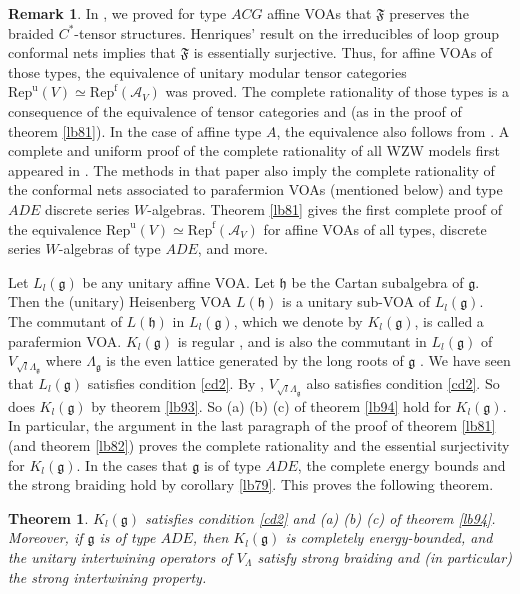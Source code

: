 \documentclass[12pt,a4paper]{article}
\theoremstyle{definition}
\newtheorem{rem}[df]{Remark}
\theoremstyle{plain}
\newtheorem{thm}[df]{Theorem}
\newcommand{\fk}{\mathfrak}
\newcommand{\mc}{\mathcal}
\newcommand{\gk}{\mathfrak g}
\newcommand{\hk}{\mathfrak h}
\newcommand{\Repf}{\mathrm{Rep}^{\mathrm f}}
\newcommand{\RepuV}{\mathrm{Rep}^{\mathrm u}(V)}
\numberwithin{equation}{subsection}
\begin{document}
\begin{rem}
In \cite{Gui21a}, we proved for type $ACG$ affine VOAs that $\fk F$ preserves the braided $C^*$-tensor structures. Henriques' result on the irreducibles of loop group conformal nets \cite{Hen19} implies that $\fk F$ is essentially surjective. Thus, for affine VOAs of those types, the equivalence of unitary modular tensor categories $\RepuV\simeq\Repf(\mc A_V)$ was proved. The complete rationality of those types is a consequence of the equivalence of tensor categories and  \cite{LX04,MTW18} (as in the proof of theorem \ref{lb81}). In the case of affine type $A$, the equivalence also follows from \cite{CCP}. A complete and uniform proof of the complete rationality of all WZW models first appeared in \cite{Ten19c}. The methods in that paper also imply the complete rationality of the conformal nets associated to parafermion VOAs (mentioned below) and type $ADE$ discrete series $W$-algebras. Theorem \ref{lb81} gives the first complete proof of the equivalence $\RepuV\simeq\Repf(\mc A_V)$ for  affine VOAs of all types,  discrete series $W$-algebras of type $ADE$, and more.
\end{rem}


Let $L_l(\gk)$ be any unitary affine VOA. Let $\fk h$ be the Cartan subalgebra of $\gk$. Then the (unitary) Heisenberg VOA $L(\hk)$ is a unitary sub-VOA of $L_l(\gk)$. The commutant of $L(\hk)$ in $L_l(\gk)$, which we denote by $K_l(\gk)$, is called a parafermion VOA.  $K_l(\gk)$ is regular \cite{DW11a,ALY14,DR17}, and is also the commutant in $L_l(\gk)$ of $V_{\sqrt l\Lambda_\gk}$ where $\Lambda_\gk$ is the even lattice generated by the long roots of $\gk$ \cite{DW11b}. We have seen that $L_l(\gk)$ satisfies condition \ref{cd2}. By \cite{Gui21a}, $V_{\sqrt l\Lambda_\gk}$ also satisfies condition \ref{cd2}. So does $K_l(\gk)$ by theorem \ref{lb93}. So (a) (b) (c) of theorem \ref{lb94} hold for $K_l(\gk)$. In particular, the argument in the last paragraph  of the proof of theorem \ref{lb81} (and theorem \ref{lb82}) proves the complete rationality and the essential surjectivity for $K_l(\gk)$. In the cases that $\gk$ is of type $ADE$, the complete energy bounds and the strong braiding hold by corollary \ref{lb79}. This proves the following theorem.


\begin{thm}
$K_l(\gk)$ satisfies condition \ref{cd2} and (a) (b) (c) of theorem \ref{lb94}. Moreover, if $\gk$ is of type $ADE$, then $K_l(\gk)$ is completely energy-bounded, and the unitary intertwining operators of $V_\Lambda$ satisfy strong braiding and (in particular) the strong intertwining property. 
\end{thm}
\end{document}
